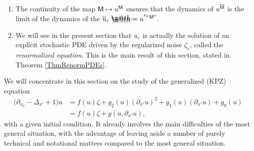 \documentclass[10pt, reqno]{amsart}
\makeatletter
\numberwithin{subsection}{section}
\numberwithin{subsubsection}{subsection}
\numberwithin{equation}{section} %
\theoremstyle{mystyle}
\theoremstyle{mystyle2}
\theoremstyle{mystyle3}
\newcommand{\ssk}{\smallskip}
\renewcommand{\epsilon}{\varepsilon}
\newcommand*{\defeq}{\mathrel{\rlap{%
                     \raisebox{0.3ex}{$\m@th\cdot$}}%
                     \raisebox{-0.3ex}{$\m@th\cdot$}}%
                     =}
\makeatother
\begin{document}
\begin{enumerate}
	\item The continuity of the map ${\sf M}\mapsto u^{\sf M}$ ensures that the dynamics of $u^{\overline{\sf M}}$ is the limit of the dynamics of the $\overline{u}_\epsilon \defeq u^{{}^{k_\epsilon}{\sf M}^\epsilon}$.
	
	\item We will see in the present section that $\overline{u}_\epsilon$ is actually the solution of an explicit stochastic PDE driven by the regularized noise $\zeta_\epsilon$, called the {\it renormalized equation}. This is the main result of this section, stated in Theorem \ref{ThmRenormPDEs}.
\end{enumerate}

We will concentrate in this section on the study of the generalized (KPZ) equation
\begin{equation}   \label{EqgKPZ}   \begin{split}
\big(\partial_{x_0}-\Delta_{x'}+1\big) u &= f(u)\zeta + g_2(u)(\partial_{x'} u)^2 + g_1(u)(\partial_{x'} u) +g_0(u)  \\
&= f(u)\zeta +g(u,\partial_{x'} u),
\end{split} \end{equation}
with a given initial condition. It already involves the main difficulties 
of the most general situation, with the advantage of leaving aside a number of purely technical and notational matters compared to the most general situation. 

\ssk
\end{document}
